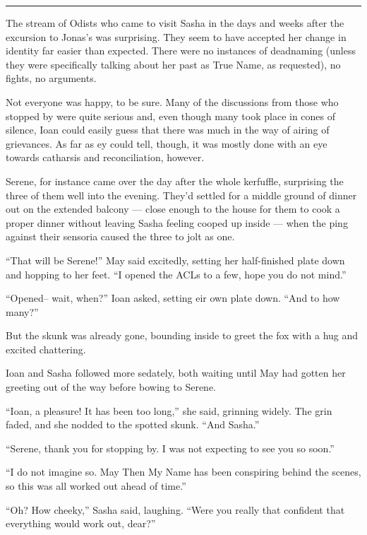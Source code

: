 \begin{center}\rule{0.5\linewidth}{0.5pt}\end{center}

The stream of Odists who came to visit Sasha in the days and weeks after the excursion to Jonas's was surprising. They seem to have accepted her change in identity far easier than expected. There were no instances of deadnaming (unless they were specifically talking about her past as True Name, as requested), no fights, no arguments.

Not everyone was happy, to be sure. Many of the discussions from those who stopped by were quite serious and, even though many took place in cones of silence, Ioan could easily guess that there was much in the way of airing of grievances. As far as ey could tell, though, it was mostly done with an eye towards catharsis and reconciliation, however.

Serene, for instance came over the day after the whole kerfuffle, surprising the three of them well into the evening. They'd settled for a middle ground of dinner out on the extended balcony — close enough to the house for them to cook a proper dinner without leaving Sasha feeling cooped up inside — when the ping against their sensoria caused the three to jolt as one.

``That will be Serene!'' May said excitedly, setting her half-finished plate down and hopping to her feet. ``I opened the ACLs to a few, hope you do not mind.''

``Opened-- wait, when?'' Ioan asked, setting eir own plate down. ``And to how many?''

But the skunk was already gone, bounding inside to greet the fox with a hug and excited chattering.

Ioan and Sasha followed more sedately, both waiting until May had gotten her greeting out of the way before bowing to Serene.

``Ioan, a pleasure! It has been too long,'' she said, grinning widely. The grin faded, and she nodded to the spotted skunk. ``And Sasha.''

``Serene, thank you for stopping by. I was not expecting to see you so soon.''

``I do not imagine so. May Then My Name has been conspiring behind the scenes, so this was all worked out ahead of time.''

``Oh? How cheeky,'' Sasha said, laughing. ``Were you really that confident that everything would work out, dear?''

